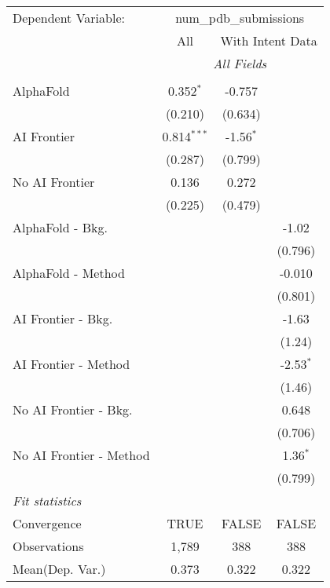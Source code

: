 \begingroup
\centering
\begin{tabular}{lccc}
   \tabularnewline \midrule \midrule
   Dependent Variable: & \multicolumn{3}{c}{num\_pdb\_submissions}\\
 & \multicolumn{1}{c}{All} & \multicolumn{2}{c}{With Intent Data} \\
\cmidrule(lr){2-2} \cmidrule(lr){3-4}
 & \multicolumn{3}{c}{\textit{All Fields}} \\ \\
   AlphaFold               & 0.352$^{*}$   & -0.757      &   \\   
                           & (0.210)       & (0.634)     &   \\   
   AI Frontier             & 0.814$^{***}$ & -1.56$^{*}$ &   \\   
                           & (0.287)       & (0.799)     &   \\   
   No AI Frontier          & 0.136         & 0.272       &   \\   
                           & (0.225)       & (0.479)     &   \\   
   AlphaFold - Bkg.        &               &             & -1.02\\   
                           &               &             & (0.796)\\   
   AlphaFold - Method      &               &             & -0.010\\   
                           &               &             & (0.801)\\   
   AI Frontier - Bkg.      &               &             & -1.63\\   
                           &               &             & (1.24)\\   
   AI Frontier - Method    &               &             & -2.53$^{*}$\\   
                           &               &             & (1.46)\\   
   No AI Frontier - Bkg.   &               &             & 0.648\\   
                           &               &             & (0.706)\\   
   No AI Frontier - Method &               &             & 1.36$^{*}$\\   
                           &               &             & (0.799)\\   
   \midrule
   \emph{Fit statistics}\\
   Convergence             &TRUE           & FALSE       & FALSE\\  
   Observations            & 1,789         & 388         & 388\\  
Mean(Dep. Var.) & 0.373 & 0.322 & 0.322 \\
   

\end{tabular}
